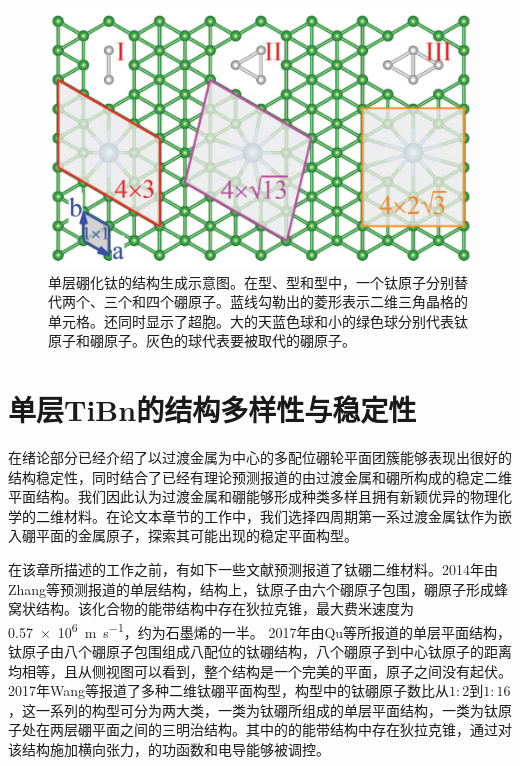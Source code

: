 \begin{figure}
  \includegraphics[width=1.0\textwidth]{figs/ch5_how_cell_choose.png}
  \centering
  \caption{单层硼化钛的结构生成示意图。在型、型和型中，一个钛原子分别替代两个、三个和四个硼原子。蓝线勾勒出的菱形表示二维三角晶格的单元格。还同时显示了超胞。大的天蓝色球和小的绿色球分别代表钛原子和硼原子。灰色的球代表要被取代的硼原子。}
  \label{fig:ch5_how_cell_choose}
\end{figure}

\section{单层TiBn的结构多样性与稳定性}
在绪论部分已经介绍了以过渡金属为中心的多配位硼轮平面团簇能够表现出很好的结构稳定性，同时结合了已经有理论预测报道的由过渡金属和硼所构成的稳定二维平面结构。我们因此认为过渡金属和硼能够形成种类多样且拥有新颖优异的物理化学的二维材料。在论文本章节的工作中，我们选择四周期第一系过渡金属钛作为嵌入硼平面的金属原子，探索其可能出现的稳定平面构型。

在该章所描述的工作之前，有如下一些文献预测报道了钛硼二维材料。2014年由Zhang等预测报道的单层结构\cite{zhang2014prediction}，结构上，钛原子由六个硼原子包围，硼原子形成蜂窝状结构。该化合物的能带结构中存在狄拉克锥，最大费米速度为\SI{0.57e6}{\meter\per\second}，约为石墨烯的一半。
2017年由Qu等所报道的单层平面结构\cite{qu2017two}，钛原子由八个硼原子包围组成八配位的钛硼结构，八个硼原子到中心钛原子的距离均相等，且从侧视图可以看到，整个结构是一个完美的平面，原子之间没有起伏。
2017年Wang\cite{wang2017semimetallic}等报道了多种二维钛硼平面构型，构型中的钛硼原子数比从$1:2$到$1:16$，这一系列的构型可分为两大类，一类为钛硼所组成的单层平面结构，一类为钛原子处在两层硼平面之间的三明治结构。其中的的能带结构中存在狄拉克锥，通过对该结构施加横向张力，的功函数和电导能够被调控。

